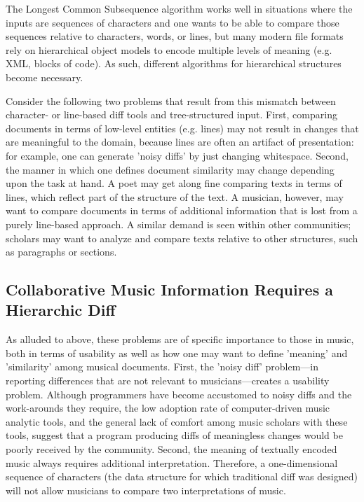 \documentclass{article}
\begin{document}
The Longest Common Subsequence algorithm works well in situations where
the inputs are sequences of characters and one wants to be
able to compare those sequences relative to characters, words, or
lines, but many modern file formats rely on
hierarchical object models to encode multiple levels of meaning
(e.g. XML, blocks of code).  As such, different algorithms for
hierarchical structures become necessary.  

Consider the following two problems that result from this mismatch
between character- or line-based diff tools and tree-structured input.
First, comparing documents in terms of low-level entities
(e.g. lines) may not result in changes that are meaningful to the
domain, because lines are often an artifact of presentation: for
example, one can generate 'noisy diffs' by just changing whitespace.
Second, the manner in which one defines document similarity may change
depending upon the task at hand.  A poet may get along fine comparing
texts in terms of lines, which reflect part of the structure of the
text.  A musician, however, may want to compare documents in terms of
additional information that is lost from a purely line-based approach.
A similar demand is seen within other communities; scholars may want
to analyze and compare texts relative to other structures, such as
paragraphs or sections.

\subsection{Collaborative Music Information Requires a Hierarchic Diff}
As alluded to above, these problems are of specific importance to
those in music, both in terms of usability as well as how one may want
to define 'meaning' and 'similarity' among musical documents.  First,
the 'noisy diff' problem---in reporting differences that are not
relevant to musicians---creates a usability problem.  Although
programmers have become accustomed to noisy diffs and the work-arounds
they require, the low adoption rate of computer-driven music analytic
tools, and the general lack of comfort among music scholars with these
tools, suggest that a program producing diffs of meaningless changes
would be poorly received by the community.  Second, the meaning of
textually encoded music always requires additional interpretation.
Therefore, a one-dimensional sequence of characters (the data
structure for which traditional diff was designed) will not allow
musicians to compare two interpretations of music.  
\end{document}
